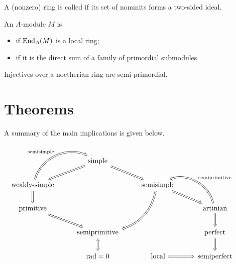 \documentclass[12pt]{article}
\begin{document}
\begin{defn}
	A (nonzero) ring is called  if its set of nonunits forms a two-sided ideal.
\end{defn}

\begin{defn}
	An $A$-module $M$ is 
	\begin{itemize}
		\item {} if $\operatorname{End}_{A}(M)$ is a local ring;
		\item {} if it is the direct sum of a family of primordial submodules.
	\end{itemize}
\end{defn}
Injectives over a noetherian ring are semi-primordial.

\part{Theorems} \label{part:theorems}

A summary of the main implications is given below.

\begin{equation*} 
	\begin{tikzcd}
	 & \text{simple} \arrow[ld, Rightarrow] \arrow[rd, Rightarrow] && \\
	\text{weakly-simple} \arrow[ru, Rightarrow, "\text{semisimple}", bend left=49] \arrow[d, Rightarrow] && \text{semisimple} \arrow[ldd, Rightarrow, bend left] \arrow[rd, Rightarrow] & \\
	\text{primitive} \arrow[rd, Rightarrow]  & & & \text{artinian} \arrow[lu, "\text{semiprimitive}"', Rightarrow, bend right=49] \arrow[d, Rightarrow] & \\
 & \text{semiprimitive} \arrow[d, Leftrightarrow]  &  & \text{perfect} \arrow[d, Rightarrow] \\
 & \rad = 0 & \text{local} \arrow[r, Rightarrow] & \text{semiperfect}  &
	\end{tikzcd}
\end{equation*}

\newcommand{\artinianimplications}[1]{%
\begin{equation*} 
	\begin{tikzcd}[ampersand replacement = \&, background color=#1]
		\text{simple} \arrow[rr, Leftrightarrow] \arrow[d, Rightarrow] \&  \& \text{weakly-simple} \arrow[rr, Leftrightarrow] \&  \& \text{primitive} \\
	\text{semisimple} \arrow[rr, Leftrightarrow]  \&  \& \rad = 0 \arrow[rr, Leftrightarrow] \& \& \text{semiprimitive}
	\end{tikzcd}	
\end{equation*}
}
\end{document}
